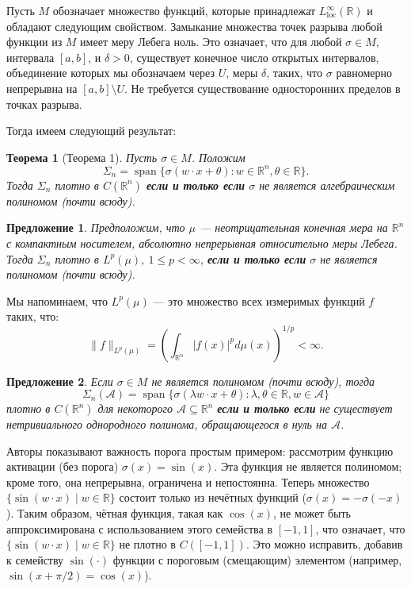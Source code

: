 \documentclass[12pt]{article}
\newtheorem{theorem}{Теорема}
\newtheorem{proposition}{Предложение}
\begin{document}
	Пусть $M$ обозначает множество функций, которые принадлежат $L^\infty_{\text{loc}}(\mathbb{R})$ и обладают следующим свойством. Замыкание множества точек разрыва любой функции из $M$ имеет меру Лебега ноль. Это означает, что для любой $\sigma \in M$, интервала $[a, b]$, и $\delta > 0$, существует конечное число открытых интервалов, объединение которых мы обозначаем через $U$, меры $\delta$, таких, что $\sigma$ равномерно непрерывна на $[a, b] \setminus U$. Не требуется существование односторонних пределов в точках разрыва.
	
	Тогда имеем следующий результат:
	
	\begin{theorem}[Теорема 1]
		Пусть $\sigma \in M$. Положим
		\[
		\Sigma_n = \operatorname{span}\{ \sigma(w \cdot x + \theta) : w \in \mathbb{R}^n, \theta \in \mathbb{R} \}.
		\]
		Тогда $\Sigma_n$ плотно в $C(\mathbb{R}^n)$ \textbf{если и только если} $\sigma$ не является алгебраическим полиномом (почти всюду).
	\end{theorem}
	
	\begin{proposition}
		Предположим, что $\mu$ — неотрицательная конечная мера на $\mathbb{R}^n$ с компактным носителем, абсолютно непрерывная относительно меры Лебега. Тогда $\Sigma_n$ плотно в $L^p(\mu)$, $1 \leq p < \infty$, \textbf{если и только если} $\sigma$ не является полиномом (почти всюду).
	\end{proposition}
	
	Мы напоминаем, что $L^p(\mu)$ — это множество всех измеримых функций $f$ таких, что:
	\[
	\|f\|_{L^p(\mu)} = \left( \int_{\mathbb{R}^n} |f(x)|^p d\mu(x) \right)^{1/p} < \infty.
	\]
	
	\begin{proposition}
		Если $\sigma \in M$ не является полиномом (почти всюду), тогда
		\[
		\Sigma_n(\mathcal{A}) = \operatorname{span}\{ \sigma(\lambda w \cdot x + \theta) : \lambda, \theta \in \mathbb{R}, w \in \mathcal{A} \}
		\]
		плотно в $C(\mathbb{R}^n)$ для некоторого $\mathcal{A} \subseteq \mathbb{R}^n$ \textbf{если и только если} не существует нетривиального однородного полинома, обращающегося в нуль на $\mathcal{A}$.
	\end{proposition}
	
	Авторы показывают важность порога простым примером: рассмотрим функцию активации (без порога) $\sigma(x) = \sin(x)$. Эта функция не является полиномом; кроме того, она непрерывна, ограничена и непостоянна. Теперь множество $\{\sin(w \cdot x) \mid w \in \mathbb{R}\}$ состоит только из нечётных функций ($\sigma(x) = -\sigma(-x)$). Таким образом, чётная функция, такая как $\cos(x)$, не может быть аппроксимирована с использованием этого семейства в $[-1, 1]$, что означает, что $\{\sin(w \cdot x) \mid w \in \mathbb{R}\}$ не плотно в $C([-1, 1])$. Это можно исправить, добавив к семейству $\sin(\cdot)$ функции с пороговым (смещающим) элементом (например, $\sin(x + \pi/2) = \cos(x)$). 
	
\end{document}
